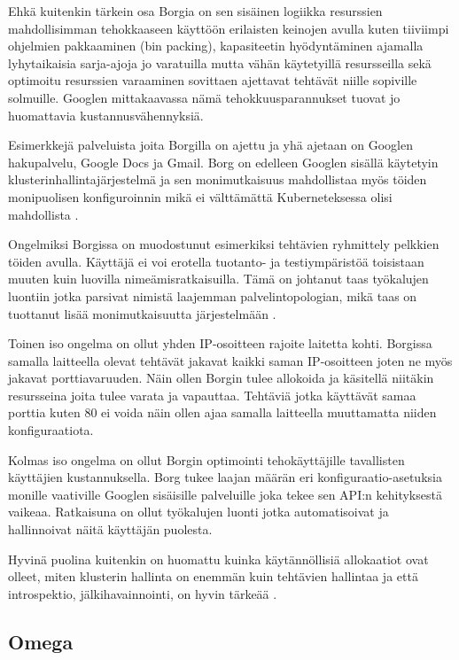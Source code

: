 \documentclass[finnish,gradu]{tktltiki3}
\begin{document}
Ehkä kuitenkin tärkein osa Borgia on sen sisäinen logiikka resurssien mahdollisimman tehokkaaseen käyttöön erilaisten keinojen avulla kuten tiiviimpi ohjelmien pakkaaminen (bin packing), kapasiteetin hyödyntäminen ajamalla lyhytaikaisia sarja-ajoja jo varatuilla mutta vähän käytetyillä resursseilla sekä optimoitu resurssien varaaminen sovittaen ajettavat tehtävät niille sopiville solmuille. Googlen mittakaavassa nämä tehokkuusparannukset tuovat jo huomattavia kustannusvähennyksiä.

Esimerkkejä palveluista joita Borgilla on ajettu ja yhä ajetaan on Googlen hakupalvelu, Google Docs ja Gmail. Borg on edelleen Googlen sisällä käytetyin klusterinhallintajärjestelmä ja sen monimutkaisuus mahdollistaa myös töiden monipuolisen konfiguroinnin mikä ei välttämättä Kuberneteksessa olisi mahdollista \cite{management-with-borg}.

Ongelmiksi Borgissa on muodostunut esimerkiksi tehtävien ryhmittely pelkkien töiden avulla. Käyttäjä ei voi erotella tuotanto- ja testiympäristöä toisistaan muuten kuin luovilla nimeämisratkaisuilla. Tämä on johtanut taas työkalujen luontiin jotka parsivat nimistä laajemman palvelintopologian, mikä taas on tuottanut lisää monimutkaisuutta järjestelmään \cite{borg-goto-youtube}.

Toinen iso ongelma on ollut yhden IP-osoitteen rajoite laitetta kohti. Borgissa samalla laitteella olevat tehtävät jakavat kaikki saman IP-osoitteen joten ne myös jakavat porttiavaruuden. Näin ollen Borgin tulee allokoida ja käsitellä niitäkin resursseina joita tulee varata ja vapauttaa. Tehtäviä jotka käyttävät samaa porttia kuten 80 ei voida näin ollen ajaa samalla laitteella muuttamatta niiden konfiguraatiota.

Kolmas iso ongelma on ollut Borgin optimointi tehokäyttäjille tavallisten käyttäjien kustannuksella. Borg tukee laajan määrän eri konfiguraatio-asetuksia monille vaativille Googlen sisäisille palveluille joka tekee sen API:n kehityksestä vaikeaa. Ratkaisuna on ollut työkalujen luonti jotka automatisoivat ja hallinnoivat näitä käyttäjän puolesta.

Hyvinä puolina kuitenkin on huomattu kuinka käytännöllisiä allokaatiot ovat olleet, miten klusterin hallinta on enemmän kuin tehtävien hallintaa ja että introspektio, jälkihavainnointi, on hyvin tärkeää \cite{management-with-borg}.

\subsection{Omega}
\end{document}
